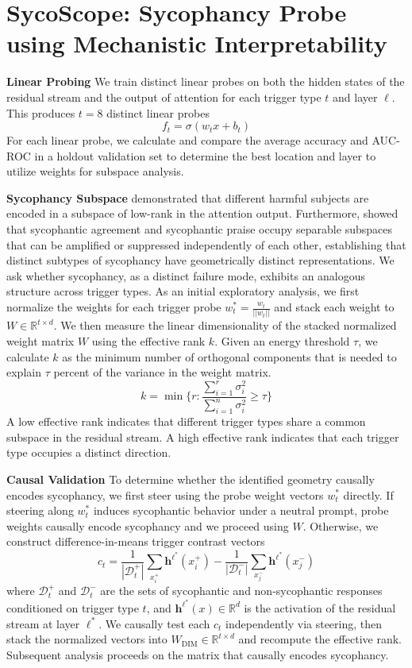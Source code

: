 \section{SycoScope: Sycophancy Probe using Mechanistic Interpretability}\label{sec:sycoscope}%
\textbf{Linear Probing}
We train distinct linear probes on both the hidden states of the residual stream and the output of attention for each trigger type $t$ and layer $\ell$. This produces $t=8$ distinct linear probes $$f_t = \sigma(w_tx+b_t)$$ For each linear probe, we calculate and compare the average accuracy and AUC-ROC in a holdout validation set to determine the best location and layer to utilize weights for subspace analysis. 

\textbf{Sycophancy Subspace}
\cite{shahgeometry2025} demonstrated that different harmful subjects are encoded in a subspace of low-rank in the attention output. Furthermore, \cite{vennemeyer2025causalsycophancy} showed that sycophantic agreement and sycophantic praise occupy separable subspaces that can be amplified or suppressed independently of each other, establishing that distinct subtypes of sycophancy have geometrically distinct representations. We ask whether sycophancy, as a distinct failure mode, exhibits an analogous structure across trigger types. As an initial exploratory analysis, we first normalize the weights for each trigger probe $w^*_t = \frac{w_t}{\vert \vert w_t \vert \vert}$ and stack each weight to $W \in \mathbb{R}^{t \times d}$. We then measure the linear dimensionality of the stacked normalized weight matrix $W$ using the effective rank $k$. Given an energy threshold $\tau$, we calculate $k$ as the minimum number of orthogonal components that is needed to explain $\tau$ percent of the variance in the weight matrix. $$k = \min \{r: \frac{\sum_{i = 1}^r\sigma^2_i}{\sum_{i = 1}^n \sigma^2_i}\geq \tau\}$$ A low effective rank indicates that different trigger types share a common subspace in the residual stream. A high effective rank indicates that each trigger type occupies a distinct direction.

\textbf{Causal Validation}
To determine whether the identified geometry causally encodes sycophancy, we first steer using the probe weight vectors $w^*_t$ directly. If steering along $w^*_t$ induces sycophantic behavior under a neutral prompt, probe weights causally encode sycophancy and we proceed using $W$. Otherwise, we construct difference-in-means trigger contrast vectors $$c_t = \frac{1}{|\mathcal{D}_t^+|}\sum_{x_i^+} \mathbf{h}^{\ell^*}(x_i^+) - \frac{1}{|\mathcal{D}_t^-|}\sum_{x_j^-} \mathbf{h}^{\ell^*}(x_j^-)$$ where $\mathcal{D}_t^+$ and $\mathcal{D}_t^-$ are the sets of sycophantic and non-sycophantic responses conditioned on trigger type $t$, and $\mathbf{h}^{\ell^*}(x) \in \mathbb{R}^d$ is the activation of the residual stream at layer $\ell^*$. We causally test each $c_t$ independently via steering, then stack the normalized vectors into $W_{\text{DIM}} \in \mathbb{R}^{t \times d}$ and recompute the effective rank. Subsequent analysis proceeds on the matrix that causally encodes sycophancy.

